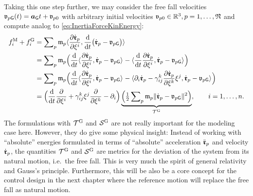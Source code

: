 \newcommand{\particleVelGravity}[1]{\particleStyle{v}_{#1\idxText{G}}}
Taking this one step further, we may consider the free fall velocities $\particleVelGravity{\PidxI}(t) = \gravityAcc t + \particleStyle{v}_{\PidxI 0}$ with arbitrary initial velocities $\mathfrak{v}_{p 0} \in \mathbb{R}^3, p=1,\ldots,\mathfrak{N}$ and compute analog to \eqref{eq:InertiaForceKinEnergy}:
\begin{align}
  \genForceInertiaCoeff{\LidxI} + \genForceGravityCoeff{\LidxI}
  &= \sumParticles \particleMass{\PidxI} \sProd{\pdiff[\particlePosd{\PidxI}]{\sysVelCoeff{\LidxI}}}{\diff{t}\big(\particlePosd{\PidxI} - \particleVelGravity{\PidxI} \big)}
 \nonumber\\
  &= \sumParticles \particleMass{\PidxI}  \Big( \diff{t} \sProd{\pdiff[\particlePosd{\PidxI}]{\sysVelCoeff{\LidxI}}}{\particlePosd{\PidxI} - \particleVelGravity{\PidxI}} - \sProd{\diff{t} \pdiff[\particlePosd{\PidxI}]{\sysVelCoeff{\LidxI}}}{\particlePosd{\PidxI} - \particleVelGravity{\PidxI}}\Big)
 \nonumber\\
  &= \sumParticles \particleMass{\PidxI}  \Big( \diff{t} \sProd{\pdiff[\particlePosd{\PidxI}]{\sysVelCoeff{\LidxI}}}{\particlePosd{\PidxI} - \particleVelGravity{\PidxI}} - \sProd{\dirDiff{\LidxI} \particlePosd{\PidxI} - \BoltzSym{\LidxIII}{\LidxI}{\LidxII} \pdiff[\particlePosd{\PidxI}]{\sysVelCoeff{\LidxIII}} \sysVelCoeff{\LidxII}}{\particlePosd{\PidxI} - \particleVelGravity{\PidxI}}\Big)
 \nonumber\\
  &= \Big(\diff{t} \pdiff{\sysVelCoeff{\LidxI}} + \BoltzSym{\LidxIII}{\LidxI}{\LidxII} \sysVelCoeff{\LidxII} \pdiff{\sysVelCoeff{\LidxIII}} - \dirDiff{\LidxI} \Big)
  \underbrace{\Big( \tfrac{1}{2} \sumParticles \particleMass{\PidxI} \norm{\particlePosd{\PidxI} - \particleVelGravity{\PidxI}}^2 \Big)}_{\kineticEnergyInertial},
  \qquad
  \LidxI = 1,\ldots,\dimConfigSpace.
\end{align}
The formulations with $\mathcal{T}^{\mathrm{G}}$ and $\mathcal{S}^{\mathrm{G}}$ are not really important for the modeling case here.
However, they do give some physical insight: 
Instead of working with ``absolute'' energies formulated in terms of ``absolute'' acceleration $\ddot{\boldsymbol{\mathfrak{r}}}_{p}$ and velocity $\dot{\boldsymbol{\mathfrak{r}}}_{p}$, the quantities $\mathcal{T}^{\mathrm{G}}$ and $\mathcal{S}^{\mathrm{G}}$ are metrics for the deviation of the system from its natural motion, i.e.\ the free fall.
This is very much the spirit of general relativity and Gauss's principle.
Furthermore, this will be also be a core concept for the control design in the next chapter where the reference motion will replace the free fall as natural motion.

